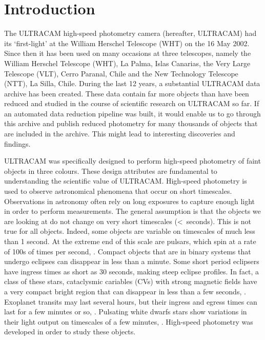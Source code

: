 \section{Introduction} 

The ULTRACAM high-speed photometry camera (hereafter, ULTRACAM) had its `first-light' at the William Herschel Telescope (WHT) on the 16 May 2002. Since then it has been used on many occasions at three telescopes, namely the William Herschel Telescope (WHT), La Palma, Islas Canarias, the Very Large Telescope (VLT), Cerro Paranal, Chile and the New Technology Telescope (NTT), La Silla, Chile. During the last 12 years, a substantial ULTRACAM data archive has been created. These data contain far more objects than have been reduced  and studied in the course of scientific research on ULTRACAM so far. If an automated data reduction pipeline was built, it would enable us to go through this archive and publish reduced photometry for many thousands of objects that are included in the archive. This might lead to interesting discoveries and findings. 

ULTRACAM was specifically designed to perform high-speed photometry of faint objects in three colours. These design attributes are fundamental to understanding the scientific value of ULTRACAM.  High-speed photometry is used to observe astronomical phenomena that occur on short timescales. Observations in astronomy often rely on long exposures to capture enough light in order to perform measurements. The general assumption is that the objects we are looking at do not change on very short timescales (\textless~seconds). This is not true for all objects. Indeed, some objects are variable on timescales of much less than 1 second. At the extreme end of this scale are pulsars, which spin at a rate of 100s of times per second, \citep{pulsarreview}. Compact objects that are in binary systems that undergo eclipses can disappear in less than a minute. Some short period eclipsers have ingress times as short as 30 seconds, making steep eclipse profiles. In fact, a class of these stars, cataclysmic cariables (CVs) with strong magnetic fields have a very compact bright region that can disappear in less than a few seconds, \citep{WarnerBook}. Exoplanet transits may last several hours, but their ingress and egress times can last for a few minutes or so, \citep{exoplanettransits}. Pulsating white dwarfs stars show variations in their light output on timescales of a few minutes, \citep{wingetreview}.  High-speed photometry was developed in order to study these objects. 

